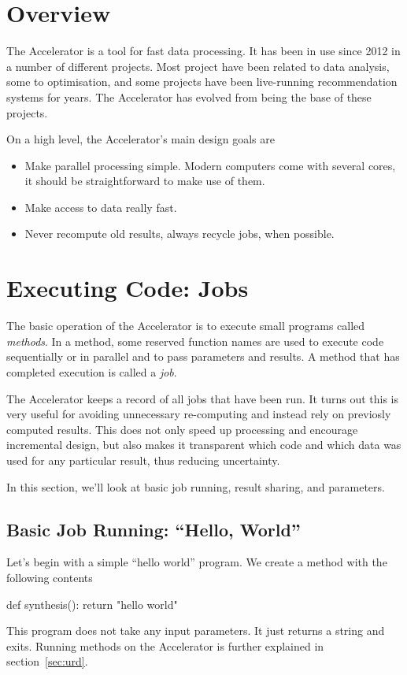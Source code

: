 \documentclass[a4paper]{article}
\begin{document}
\clearpage
\section{Overview}
The Accelerator is a tool for fast data processing.  It has been in
use since 2012 in a number of different projects.  Most project have
been related to data analysis, some to optimisation, and some projects
have been live-running recommendation systems for years.  The
Accelerator has evolved from being the base of these projects.


On a high level, the Accelerator's main design goals are
\begin{itemize}
\item[] Make parallel processing simple.  Modern computers come with
  several cores, it should be straightforward to make use of them.
\item[] Make access to data really fast.
\item[] Never recompute old results, always recycle jobs, when
  possible.
\end{itemize}




\clearpage
\section{Executing Code: Jobs}
The basic operation of the Accelerator is to execute small programs
called \textsl{methods}.  In a method, some reserved function names
are used to execute code sequentially or in parallel and to pass
parameters and results.  A method that has completed execution is
called a \textsl{job}.

The Accelerator keeps a record of all jobs that have been run.  It
turns out this is very useful for avoiding unnecessary re-computing
and instead rely on previosly computed results.  This does not only
speed up processing and encourage incremental design, but also makes
it transparent which code and which data was used for any particular
result, thus reducing uncertainty.

In this section, we'll look at basic job running, result sharing, and
parameters.


\subsection{Basic Job Running:  ``Hello, World''}

Let's begin with a simple ``hello world'' program.  We create a method
with the following contents
\begin{python}
def synthesis():
    return "hello world"
\end{python}
This program does not take any input parameters.  It just returns a
string and exits.  Running methods on the Accelerator is further
explained in section~\ref{sec:urd}.
\end{document}
